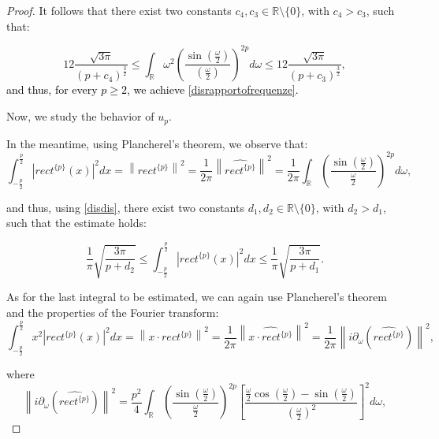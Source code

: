 \documentclass[preprint,hidelinks,authoryear]{elsarticle}
\theoremstyle{plain}
\theoremstyle{definition}
\theoremstyle{remark}
\begin{document}
\begin{proof}
It follows that there exist two constants $c_4, c_3 \in \mathbb{R} \setminus \{0\}$, with $c_4 > c_3$, such that: 

\begin{equation}
12\displaystyle\frac{\sqrt{3\pi}}{(p+c_4)^{\frac{3}{2}}} \le \displaystyle\int_{\mathbb{R}} \omega^2\left(\displaystyle\frac{\sin{\displaystyle
    \left(\frac{\omega}{2}\right)}}{\left(\displaystyle
    \frac{\omega}{2}\right)}\right)^{2p} d\omega \le 12\displaystyle\frac{\sqrt{3\pi}}{(p+c_3)^{\frac{3}{2}}},
     \label{disomega2}
\end{equation}
\textcolor{black}{and thus, for every $p \ge 2$, we achieve \eqref{disrapportofrequenze}.}

Now, we study the behavior of $u_p$.

In the meantime, using Plancherel's theorem, we observe that:
\begin{equation}
    \displaystyle\int_{-\frac{p}{2}}^{\frac{p}{2}} |rect^{\{p\}}(x)|^2 dx=\left\| rect^{\{p\}}\right\|^2= \displaystyle\frac{1}{2\pi}\left\|\widehat{rect^{\{p\}}}\right\|^2=\displaystyle\frac{1}{2\pi}\int_{\mathbb{R}}\left(\displaystyle\frac{\sin(\frac{\omega}{2})}{\frac{\omega}{2}}\right)^{2p} d\omega ,
    \label{disomega2}
\end{equation}

and thus, using \eqref{disdis}, there exist two constants $d_1, d_2 \in \mathbb{R} \setminus \{0\}$, with $d_2 > d_1$, such that the estimate holds:

\begin{equation}
    \displaystyle\frac{1}{\pi}\displaystyle\sqrt{\frac{3\pi}{p+d_2}} \le  \displaystyle\int_{-\frac{p}{2}}^{\frac{p}{2}} |rect^{\{p\}}(x)|^2 dx \le \displaystyle\frac{1}{\pi}\displaystyle\sqrt{\frac{3\pi}{p+d_1}}.
    \label{disspazio importnte}
\end{equation}

As for the last integral to be estimated, we can again use Plancherel's theorem and the properties of the Fourier transform:
\begin{equation}
    \displaystyle\int_{-\frac{p}{2}}^{\frac{p}{2}} x^2|rect^{\{p\}}(x)|^2 dx=\left\|x \cdot rect^{\{p\}}\right\|^2=\displaystyle\frac{1}{2\pi}\left\|\widehat{x \cdot rect^{\{p\}}}\right\|^2=\displaystyle\frac{1}{2\pi}\left\|i\partial_{\omega}(\widehat{rect^{\{p\}}})\right\|^2,
\end{equation}

where
\begin{equation}
   \left\|i\partial_{\omega}(\widehat{rect^{\{p\}}})\right\|^2=\displaystyle\frac{p^2}{4}\displaystyle\int_{\mathbb{R}}\left(\displaystyle\frac{\sin(\frac{\omega}{2})}{\frac{\omega}{2}}\right)^{2p}\left[\displaystyle\frac{\frac{\omega}{2}\cos(\frac{\omega}{2})-\sin(\frac{\omega}{2})}{(\frac{\omega
   }{2})^2}\right]^2 d\omega,
\end{equation}


\end{proof}
\end{document}
